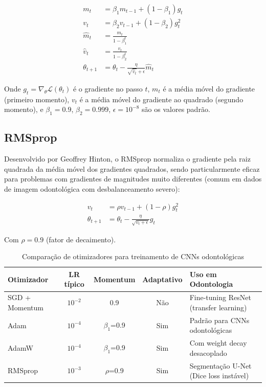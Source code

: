 \begin{align}
  m_t &= \beta_1 m_{t-1} + (1 - \beta_1) g_t \label{eq:adam-m} \\
  v_t &= \beta_2 v_{t-1} + (1 - \beta_2) g_t^2 \label{eq:adam-v} \\
  \hat{m}_t &= \frac{m_t}{1 - \beta_1^t} \label{eq:adam-mhat} \\
  \hat{v}_t &= \frac{v_t}{1 - \beta_2^t} \label{eq:adam-vhat} \\
  \theta_{t+1} &= \theta_t - \frac{\eta}{\sqrt{\hat{v}_t} + \epsilon} \hat{m}_t \label{eq:adam-update}
\end{align}

Onde $g_t = \nabla_{\theta} \mathcal{L}(\theta_t)$ é o gradiente no passo $t$,
$m_t$ é a média móvel do gradiente (primeiro momento), $v_t$ é a média móvel do
gradiente ao quadrado (segundo momento), e $\beta_1=0.9$, $\beta_2=0.999$,
$\epsilon=10^{-8}$ são os valores padrão.

\subsection{RMSprop}

Desenvolvido por Geoffrey Hinton, o RMSprop normaliza o gradiente pela raiz
quadrada da média móvel dos gradientes quadrados, sendo particularmente eficaz
para problemas com gradientes de magnitudes muito diferentes (comum em dados
de imagem odontológica com desbalanceamento severo):

\begin{align}
  v_t &= \rho v_{t-1} + (1 - \rho) g_t^2 \label{eq:rmsprop-v} \\
  \theta_{t+1} &= \theta_t - \frac{\eta}{\sqrt{v_t + \epsilon}} g_t \label{eq:rmsprop-update}
\end{align}

Com $\rho=0.9$ (fator de decaimento).

\begin{table}[H]
  \centering
  \caption{Comparação de otimizadores para treinamento de CNNs odontológicas}
  \label{tab:otimizadores}
  \begin{tabularx}{\textwidth}{lcccX}
    \toprule
    \textbf{Otimizador} & \textbf{LR típico} & \textbf{Momentum} & \textbf{Adaptativo} & \textbf{Uso em Odontologia} \\
    \midrule
    SGD + Momentum & $10^{-2}$ & 0.9 & Não & Fine-tuning ResNet (transfer learning) \\
    Adam & $10^{-4}$ & $\beta_1$=0.9 & Sim & Padrão para CNNs odontológicas \\
    AdamW & $10^{-4}$ & $\beta_1$=0.9 & Sim & Com weight decay desacoplado \\
    RMSprop & $10^{-3}$ & $\rho$=0.9 & Sim & Segmentação U-Net (Dice loss instável) \\
    \bottomrule
  \end{tabularx}
\end{table}

